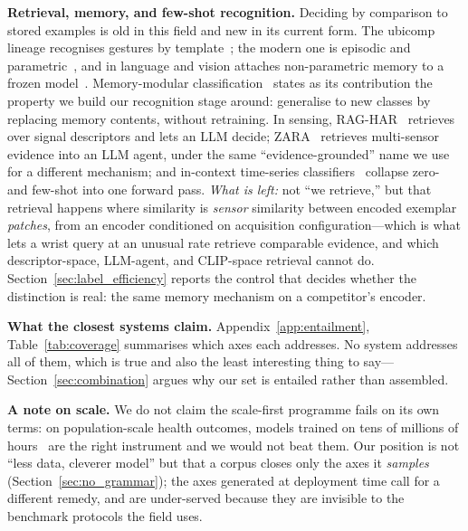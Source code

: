 \textbf{Retrieval, memory, and few-shot recognition.}
Deciding by comparison to stored examples is old in this field and new in its current form. The
ubicomp lineage recognises gestures by template~\cite{uwave,junker,warpinglcss}; the modern one
is episodic and parametric~\cite{matchingnet,protonet}, and in language and vision attaches
non-parametric memory to a frozen model~\cite{knnlm,rag,retro,knnvision,reco}. Memory-modular
classification~\cite{memorymodular} states as its contribution the property we build our
recognition stage around: generalise to new classes by replacing memory contents, without
retraining. In sensing,
RAG-HAR~\cite{raghar} retrieves over signal descriptors and lets an LLM decide;
ZARA~\cite{zara} retrieves multi-sensor evidence into an LLM agent, under the same
``evidence-grounded'' name we use for a different mechanism; and in-context time-series
classifiers~\cite{timee,ticfm} collapse zero- and few-shot into one forward pass.
\emph{What is left:} not ``we retrieve,'' but that retrieval happens where similarity is
\emph{sensor} similarity between encoded exemplar \emph{patches}, from an encoder conditioned on
acquisition configuration---which is what lets a wrist query at an unusual rate retrieve
comparable evidence, and which descriptor-space, LLM-agent, and CLIP-space retrieval cannot do.
Section~\ref{sec:label_efficiency} reports the control that decides whether the distinction is
real: the same memory mechanism on a competitor's encoder.

\textbf{What the closest systems claim.} Appendix~\ref{app:entailment},
Table~\ref{tab:coverage} summarises which axes each addresses. No system addresses all of them,
which is true and also the least interesting thing to say---Section~\ref{sec:combination} argues
why our set is entailed rather than assembled.

\textbf{A note on scale.} We do not claim the scale-first programme fails on its own terms: on
population-scale health outcomes, models trained on tens of millions of
hours~\cite{sslwearables,lsm1,sensorlm} are the right instrument and we would not beat them. Our
position is not ``less data, cleverer model'' but that a corpus closes only the axes it
\emph{samples} (Section~\ref{sec:no_grammar}); the axes generated at deployment time call for a
different remedy, and are under-served because they are invisible to the benchmark protocols the
field uses.
